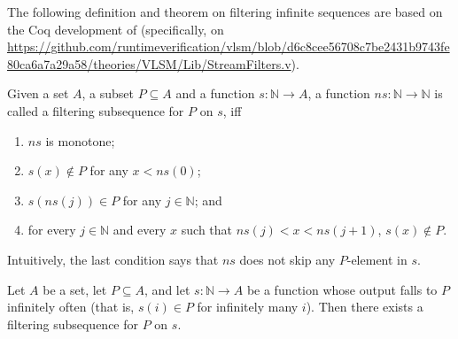 \documentclass{article}
\begin{document}
The following definition and theorem on filtering infinite sequences
are based on the Coq development of \cite{ZamfirVLSM}
(specifically, on \url{https://github.com/runtimeverification/vlsm/blob/d6c8cee56708c7be2431b9743fe80ca6a7a29a58/theories/VLSM/Lib/StreamFilters.v}).
\begin{definition}\label{def:filteringSubsequence}
Given a set $A$, a subset $P \subseteq A$ and a function $s : \mathbb{N} \to A$,
a function $\mathit{ns} : \mathbb{N} \to \mathbb{N}$ is called a filtering subsequence for $P$ on $s$,
iff
\begin{enumerate}
    \item $\mathit{ns}$ is monotone;
    \item $s(x) \not \in P$ for any $x < ns(0)$;
    \item $s(\mathit{ns}(j)) \in P$ for any $j \in \mathbb{N}$; and
    \item for every $j \in \mathbb{N}$ and every $x$ such that $\mathit{ns}(j) < x < \mathit{ns}(j+1)$,
          $s(x) \not\in P$.
\end{enumerate}
Intuitively, the last condition says that $ns$ does not skip any $P$-element in $s$.
\end{definition}

\begin{lemma}\label{lem:filteringSubsequenceExistsForInfinite}
    Let $A$ be a set, let $P \subseteq A$, and let $s : \mathbb{N} \to A$ be a function whose output
    falls to $P$ infinitely often (that is, $s(i) \in P$ for infinitely many $i$).
    Then there exists a filtering subsequence for $P$ on $s$.
\end{lemma}
\end{document}

